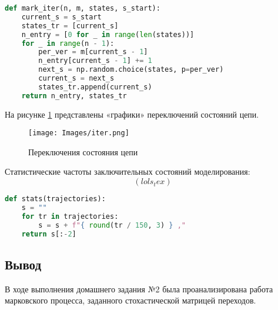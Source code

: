  \begin{lstlisting}[language=python, label=prog,caption={\textit{реализация марковского процесса}}]
def mark_iter(n, m, states, s_start):
    current_s = s_start
    states_tr = [current_s]
    n_entry = [0 for _ in range(len(states))]
    for _ in range(n - 1):
        per_ver = m[current_s - 1]
        n_entry[current_s - 1] += 1
        next_s = np.random.choice(states, p=per_ver)
        current_s = next_s
        states_tr.append(current_s)
    return n_entry, states_tr
\end{lstlisting}

На рисунке \ref{iter} представлены «графики» переключений состояний цепи.

\begin{figure}[H]
\centerline{\texttt{[image: Images/iter.png]}}
\caption{Переключения состояния цепи}
\label{iter}
\end{figure}

Статистические частоты заключительных состояний моделирования:
$$( {{ lols_tex }} )$$

\begin{lstlisting}[language=python, label=prog,caption={\textit{реализация подсчета частот}}]
def stats(trajectories):
    s = ""
    for tr in trajectories:
        s = s + f"{ round(tr / 150, 3) } ,"
    return s[:-2]
\end{lstlisting}

\subsection{Вывод}
В ходе выполнения домашнего задания №2 была проанализирована работа марковского процесса, заданного стохастической матрицей переходов.


